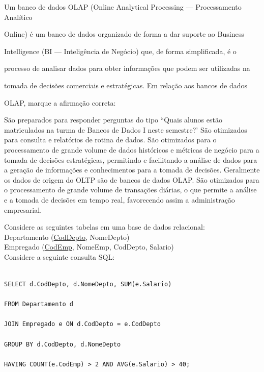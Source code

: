\documentclass[12pt, addpoints]{exam}
\begin{document}
\begin{questions}
\question

Um banco de dados OLAP (Online Analytical Processing --- Processamento Analítico

Online) é um banco de dados organizado de forma a dar suporte ao Business

Intelligence (BI --- Inteligência de Negócio) que, de forma simplificada, é o

processo de analisar dados para obter informações que podem ser utilizadas na

tomada de decisões comerciais e estratégicas. Em relação aos bancos de dados

OLAP, marque a afirmação correta:
\begin{choices}
\choice São preparados para responder perguntas do tipo ``Quais alunos estão matriculados na turma de Bancos de Dados I neste semestre?'
\choice São otimizados para consulta e relatórios de rotina de dados.
\choice São otimizados para o processamento de grande volume de dados históricos e métricas de negócio para a tomada de decisões estratégicas, permitindo e facilitando a análise de dados para a geração de informações e conhecimentos para a tomada de decisões.
\choice Geralmente os dados de origem do OLTP são de bancos de dados OLAP.
\choice São otimizados para o processamento de grande volume de transações diárias, o que permite a análise e a tomada de decisões em tempo real, favorecendo assim a administração empresarial.
\end{choices}

\question

Considere as seguintes tabelas em uma base de dados relacional:\\

Departamento (\underline{CodDepto}, NomeDepto)\\

Empregado (\underline{CodEmp}, NomeEmp, CodDepto, Salario)\\

Considere a seguinte consulta SQL:

\begin{verbatim}

SELECT d.CodDepto, d.NomeDepto, SUM(e.Salario)

FROM Departamento d

JOIN Empregado e ON d.CodDepto = e.CodDepto

GROUP BY d.CodDepto, d.NomeDepto

HAVING COUNT(e.CodEmp) > 2 AND AVG(e.Salario) > 40;


\end{verbatim}
\end{questions}
\end{document}

